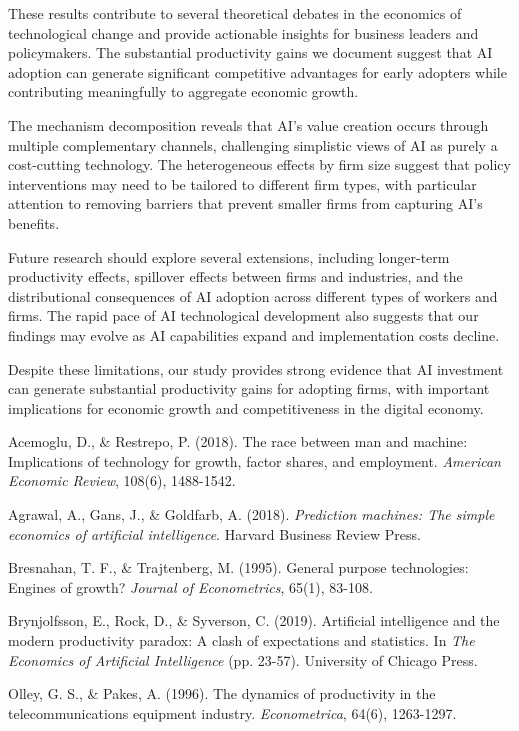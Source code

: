 \documentclass[12pt]{article}
\begin{document}
These results contribute to several theoretical debates in the economics of technological change and provide actionable insights for business leaders and policymakers. The substantial productivity gains we document suggest that AI adoption can generate significant competitive advantages for early adopters while contributing meaningfully to aggregate economic growth.

The mechanism decomposition reveals that AI's value creation occurs through multiple complementary channels, challenging simplistic views of AI as purely a cost-cutting technology. The heterogeneous effects by firm size suggest that policy interventions may need to be tailored to different firm types, with particular attention to removing barriers that prevent smaller firms from capturing AI's benefits.

Future research should explore several extensions, including longer-term productivity effects, spillover effects between firms and industries, and the distributional consequences of AI adoption across different types of workers and firms. The rapid pace of AI technological development also suggests that our findings may evolve as AI capabilities expand and implementation costs decline.

Despite these limitations, our study provides strong evidence that AI investment can generate substantial productivity gains for adopting firms, with important implications for economic growth and competitiveness in the digital economy.

\newpage


\begin{thebibliography}{99}

Acemoglu, D., \& Restrepo, P. (2018). The race between man and machine: Implications of technology for growth, factor shares, and employment. \textit{American Economic Review}, 108(6), 1488-1542.

Agrawal, A., Gans, J., \& Goldfarb, A. (2018). \textit{Prediction machines: The simple economics of artificial intelligence}. Harvard Business Review Press.

Bresnahan, T. F., \& Trajtenberg, M. (1995). General purpose technologies: Engines of growth? \textit{Journal of Econometrics}, 65(1), 83-108.

Brynjolfsson, E., Rock, D., \& Syverson, C. (2019). Artificial intelligence and the modern productivity paradox: A clash of expectations and statistics. In \textit{The Economics of Artificial Intelligence} (pp. 23-57). University of Chicago Press.

Olley, G. S., \& Pakes, A. (1996). The dynamics of productivity in the telecommunications equipment industry. \textit{Econometrica}, 64(6), 1263-1297.

\end{thebibliography}
\end{document}
